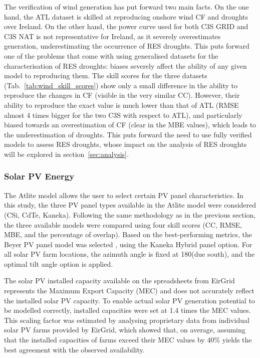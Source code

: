 \documentclass[preprint, 12pt]{elsarticle}
\begin{document}
The verification of wind generation has put forward two main facts. On the one hand, the ATL dataset is skilled at reproducing onshore wind CF and droughts over Ireland. On the other hand, the power curve used for both C3S GRID and C3S NAT is not representative for Ireland, as it severely overestimates generation, underestimating the occurrence of RES droughts. This puts forward one of the problems that come with using generalised datasets for the characterisation of RES droughts: biases severely affect the ability of any given model to reproducing them. The skill scores for the three datasets (Tab.~\ref{tab:wind_skill_scores}) show only a small difference in the ability to reproduce the changes in CF (visible in the very similar CC). However, their ability to reproduce the exact value is much lower than that of ATL (RMSE almost 4 times bigger for the two C3S with respect to ATL), and particularly biased towards an overestimation of CF (clear in the MBE values), which leads to the underestimation of droughts. This puts forward the need to use fully verified models to assess RES droughts, whose impact on the analysis of RES droughts will be explored in section~\ref{sec:analysis}.

\subsubsection{Solar PV Energy}
\label{sec:pv_verification}

The Atlite model allows the user to select certain PV panel characteristics. In this study, the three PV panel types available in the Atlite model were considered (CSi, CdTe, Kaneka). Following the same methodology as in the previous section, the three available models were compared using four skill scores (CC, RMSE, MBE, and the percentage of overlap). Based on the best-performing metrics, the Beyer PV panel model was selected \citep{beyer2004pv}, using the Kaneka Hybrid panel option. For all solar PV farm locations, the azimuth angle is fixed at 180\textdegree (due south), and the optimal tilt angle option is applied. 

The solar PV installed capacity available on the spreadsheets from EirGrid represents the Maximum Export Capacity (MEC) and does not accurately reflect the installed solar PV capacity. To enable actual solar PV generation potential to be modelled correctly, installed capacities were set at 1.4 times the MEC values. This scaling factor was estimated by analysing proprietary data from individual solar PV farms provided by EirGrid, which showed that, on average, assuming that the installed capacities of farms exceed their MEC values by 40\% yields the best agreement with the observed availability.
\end{document}

